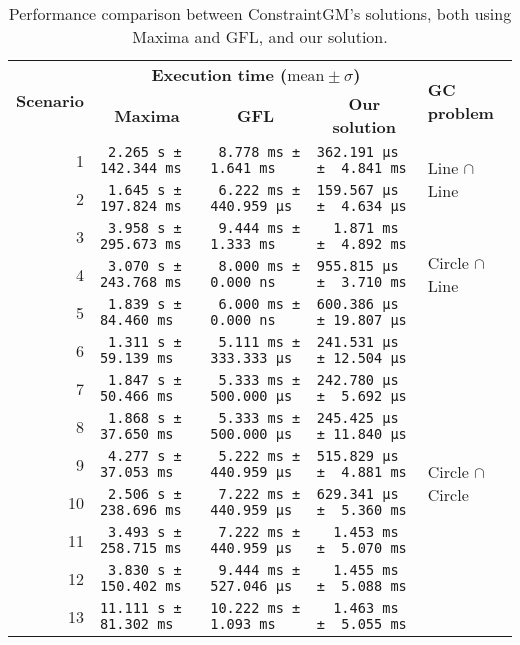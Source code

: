 \begin{table}[htb]
  \caption[ConstraintGM performance benchmarks]{\label{tab:eval.cgm.perf}%
    Performance comparison between ConstraintGM's solutions, both using Maxima
    and \ac{GFL}, and our solution.}
  \footnotesize\centering
  \begin{tabular*}{\linewidth}{r*{3}{l}l}
    \toprule
    \multirow{2}{*}{\textbf{Scenario}}
    & \multicolumn{3}{c}{\textbf{Execution time ($\mathrm{mean}\pm\sigma$)}}
    & \multirow{2}{*}{\textbf{GC problem}} \\
    & \multicolumn{1}{c}{\textbf{Maxima}}
    & \multicolumn{1}{c}{\textbf{GFL}}
    & \multicolumn{1}{c}{\textbf{Our solution}} & \\
    \midrule
     1 & \verb| 2.265 s ± 142.344 ms|
       & \verb| 8.778 ms ±   1.641 ms|
       & \verb|362.191 μs ±  4.841 ms|
       & \multirow{2}{*}{Line $\cap$ Line}\\
     2 & \verb| 1.645 s ± 197.824 ms|
       & \verb| 6.222 ms ± 440.959 μs|
       & \verb|159.567 μs ±  4.634 μs| &\\
    \midrule
     3 & \verb| 3.958 s ± 295.673 ms|
       & \verb| 9.444 ms ±   1.333 ms|
       & \verb|  1.871 ms ±  4.892 ms| 
       & \multirow{3}{*}{Circle $\cap$ Line}\\
     4 & \verb| 3.070 s ± 243.768 ms|
       & \verb| 8.000 ms ±   0.000 ns|
       & \verb|955.815 μs ±  3.710 ms| &\\
     5 & \verb| 1.839 s ±  84.460 ms|
       & \verb| 6.000 ms ±   0.000 ns|
       & \verb|600.386 μs ± 19.807 μs| &\\
    \midrule
     6 & \verb| 1.311 s ±  59.139 ms|
       & \verb| 5.111 ms ± 333.333 μs|
       & \verb|241.531 μs ± 12.504 μs| 
       & \multirow{8}{*}{Circle $\cap$ Circle}\\
     7 & \verb| 1.847 s ±  50.466 ms|
       & \verb| 5.333 ms ± 500.000 μs|
       & \verb|242.780 μs ±  5.692 μs| &\\
     8 & \verb| 1.868 s ±  37.650 ms|
       & \verb| 5.333 ms ± 500.000 μs|
       & \verb|245.425 μs ± 11.840 μs| &\\
     9 & \verb| 4.277 s ±  37.053 ms|
       & \verb| 5.222 ms ± 440.959 μs|
       & \verb|515.829 μs ±  4.881 ms| &\\
    10 & \verb| 2.506 s ± 238.696 ms|
       & \verb| 7.222 ms ± 440.959 μs|
       & \verb|629.341 μs ±  5.360 ms| &\\
    11 & \verb| 3.493 s ± 258.715 ms|
       & \verb| 7.222 ms ± 440.959 μs|
       & \verb|  1.453 ms ±  5.070 ms| &\\
    12 & \verb| 3.830 s ± 150.402 ms|
       & \verb| 9.444 ms ± 527.046 μs|
       & \verb|  1.455 ms ±  5.088 ms| &\\
    13 & \verb|11.111 s ±  81.302 ms|
       & \verb|10.222 ms ±   1.093 ms|
       & \verb|  1.463 ms ±  5.055 ms| &\\
    \bottomrule
  \end{tabular*}
\end{table}

